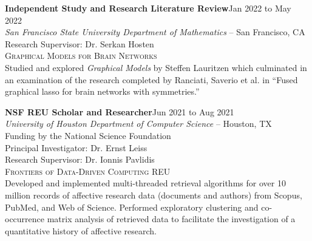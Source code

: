 \documentclass[hidelinks, 10pt]{article}
\begin{document}
{{\begin{minipage}[ct]{0.9\linewidth}
\textbf{Independent Study and Research Literature Review}\hfill Jan 2022 to May 2022\\
\emph{San Francisco State University Department of Mathematics} -- San Francisco, CA\\
Research Supervisor: Dr. Serkan Hosten\\
{\textsc{Graphical Models for Brain Networks}}
\vspace{1mm}\\
Studied and explored \emph{Graphical Models} by Steffen Lauritzen which
culminated in an examination of the research completed by Ranciati, Saverio et
al. in ``Fused graphical lasso for brain networks with symmetries.''
\end{minipage}

\vspace{4mm}

\begin{minipage}[ct]{0.9\linewidth}
\textbf{NSF REU Scholar and Researcher}\hfill Jun 2021 to Aug 2021\\
\emph{University of Houston Department of Computer Science} -- Houston, TX\\
Funding by the National Science Foundation\\
Principal Investigator: Dr. Ernst Leiss\\
Research Supervisor: Dr. Ionnis Pavlidis\\
{\textsc{Frontiers of Data-Driven Computing REU}}
\vspace{1mm}\\
Developed and implemented multi-threaded retrieval algorithms for over 10 million
records of affective research data (documents and authors) from Scopus, PubMed,
and Web of Science. Performed exploratory clustering and co-occurrence matrix
analysis of retrieved data to facilitate the investigation of a quantitative history of
affective research.
\end{minipage}

}}
\end{document}
